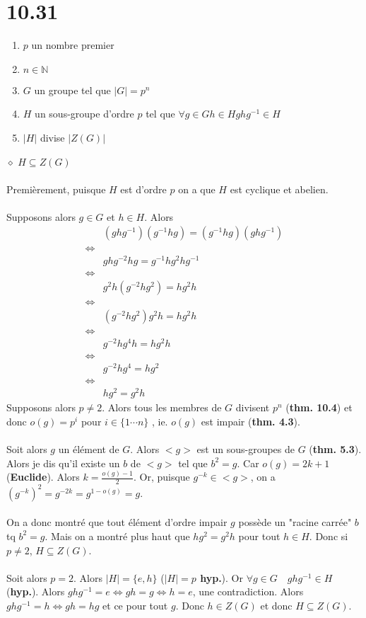 \documentclass[a4paper,10pt]{article}
\begin{document}
\section*{10.31}
\begin{enumerate}
 \item $p$ un nombre premier
 \item $n \in \mathbb{N}$
 \item $G$ un groupe tel que $|G| = p^n$
 \item $H$ un sous-groupe d'ordre $p$ tel que $\forall g \in G h \in H ghg^{-1} \in H$
 \item $|H|$ divise $|Z(G)|$
\end{enumerate}
$\diamond$ \textbf{$H \subseteq Z(G)$}
\\
\\
Premièrement, puisque $H$ est d'ordre $p$ on a que $H$ est cyclique et abelien. 
\\
\\
Supposons alors $g \in G$ et $h \in H$. Alors 
\begin{align*}
& (ghg^{-1})(g^{-1}hg) = (g^{-1}hg)(ghg^{-1}) \\
\Leftrightarrow \\
& ghg^{-2}hg = g^{-1}hg^2hg^{-1} \\
\Leftrightarrow \\
& g^2h(g^{-2}hg^2) = hg^2h \\ 
\Leftrightarrow \\
& (g^{-2}hg^2)g^2h = hg^2h  \\
\Leftrightarrow \\
& g^{-2}hg^4h = hg^2h \\
\Leftrightarrow \\
& g^{-2}hg^4 = hg^2 \\
\Leftrightarrow \\
& hg^2 = g^2h
\end{align*}
Supposons alors $p \not = 2$. Alors tous les membres de $G$ divisent $p^n$ (\textbf{thm. 10.4}) et donc $o(g) = p^i$ pour $i \in \{1 \cdots n\}$
, ie. $o(g)$ est impair (\textbf{thm. 4.3}). 
\\
\\
Soit alors $g$ un élément de $G$. Alors $<g>$ est un sous-groupes de $G$ (\textbf{thm. 5.3}). Alors je dis qu'il existe un $b$ de $<g>$ tel que 
$b^2 = g$. Car $o(g) = 2k + 1$ (\textbf{Euclide}). Alors $k = \frac{o(g)-1}{2}$. Or, puisque $g^{-k} \in <g>$, on a $(g^{-k})^2 = g^{-2k} = g^{1-o(g)} = g$.
\\
\\
On a donc montré que tout élément d'ordre impair $g$ possède un "racine carrée" $b$ tq $b^2 = g$. Mais on a montré plus haut 
que $hg^2 = g^2h$ pour tout $h \in H$. Donc si $p \not = 2$, $H \subseteq Z(G)$. 
\\
\\
Soit alors $p = 2$. Alors $|H| = \{e,h\}$ (\textbf{$|H| = p$ hyp.}). Or $\forall g\in G \quad ghg^{-1} \in H$ (\textbf{hyp.}). 
Alors $ghg^{-1} = e \Leftrightarrow gh = g \Leftrightarrow h = e$, une contradiction. Alors $ghg^{-1} = h \Leftrightarrow gh = hg$ et ce pour tout
$g$. Donc $h \in Z(G)$ et donc $H \subseteq Z(G)$.
\end{document}
